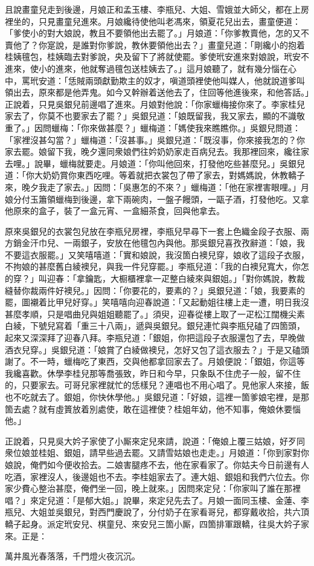 且說畫童兒走到後邊，月娘正和孟玉樓、李瓶兒、大姐、雪娥並大師父，都在上房裡坐的，只見畫童兒進來。月娘纔待使他叫老馮來，領夏花兒出去，畫童便道：「爹使小的對大娘說，教且不要領他出去罷了。」月娘道：「你爹教賣他，怎的又不賣他了？你寔說，是誰對你爹說，教休要領他出去？」畫童兒道：「剛纔小的抱着桂姨氊包，桂姨臨去對爹說，央及留下了將就使罷。爹使玳安進來對娘說，玳安不進來，使小的進來，他就奪過氊包送桂姨去了。」這月娘聽了，就有幾分惱在心中，罵玳安道：「恁賊兩頭獻勤欺主的奴才，嗔道頭裡使他叫媒人，他就說道爹叫領出去，原來都是他弄鬼。如今又幹辦着送他去了，住回等他進後來，和他答話。」正說着，只見吳銀兒前邊唱了進來。月娘對他說：「你家蠟梅接你來了。李家桂兒家去了，你莫不也要家去了罷？」吳銀兒道：「娘既留我，我又家去，顯的不識敬重了。」因問蠟梅：「你來做甚麼？」蠟梅道：「媽使我來瞧瞧你。」吳銀兒問道：「家裡沒甚勾當？」蠟梅道：「沒甚事。」吳銀兒道：「既沒事，你來接我怎的？你家去罷。娘留下我，晚夕還同衆娘們往妗奶奶家走百病兒去。我那裡回來，纔往家去哩。」說畢，蠟梅就要走。月娘道：「你叫他回來，打發他吃些甚麼兒。」吳銀兒道：「你大奶奶賞你東西吃哩。等着就把衣裳包了帶了家去，對媽媽說，休教轎子來，晚夕我走了家去。」因問：「吳惠怎的不來？」蠟梅道：「他在家裡害眼哩。」月娘分付玉簫領蠟梅到後邊，拿下兩碗肉，一盤子饅頭，一甌子酒，打發他吃。又拿他原來的盒子，裝了一盒元宵、一盒細茶食，回與他拿去。

原來吳銀兒的衣裳包兒放在李瓶兒房裡，李瓶兒早尋下一套上色織金段子衣服、兩方銷金汗巾兒、一兩銀子，安放在他氊包內與他。那吳銀兒喜孜孜辭道：「娘，我不要這衣服罷。」又笑嘻嘻道：「實和娘說，我沒箇白襖兒穿，娘收了這段子衣服，不拘娘的甚麼舊白綾襖兒，與我一件兒穿罷。」李瓶兒道：「我的白襖兒寬大，你怎的穿？」叫迎春：「拿鑰匙，大橱櫃裡拿一疋整白綾來與銀姐。」「對你媽說，教裁縫替你裁兩件好襖兒。」因問：「你要花的，要素的？」吳銀兒道：「娘，我要素的罷，圖襯着比甲兒好穿。」笑嘻嘻向迎春說道：「又起動姐往樓上走一遭，明日我沒甚麼孝順，只是唱曲兒與姐姐聽罷了。」須臾，迎春從樓上取了一疋松江闊機尖素白綾，下號兒寫着「重三十八兩」，遞與吳銀兒。銀兒連忙與李瓶兒磕了四箇頭，起來又深深拜了迎春八拜。李瓶兒道：「銀姐，你把這段子衣服還包了去，早晚做酒衣兒穿。」吳銀兒道：「娘賞了白綾做襖兒，怎好又包了這衣服去？」于是又磕頭謝了。不一時，蠟梅吃了東西，交與他都拿回家去了。月娘便說：「銀姐，你這等我纔喜歡。休學李桂兒那等喬張致，昨日和今早，只象臥不住虎子一般，留不住的，只要家去。可哥兒家裡就忙的恁樣兒？連唱也不用心唱了。見他家人來接，飯也不吃就去了。銀姐，你快休學他。」吳銀兒道：「好娘，這裡一箇爹娘宅裡，是那箇去處？就有虛篢放着別處使，敢在這裡使？桂姐年幼，他不知事，俺娘休要惱他。」{}

正說着，只見吳大妗子家使了小厮來定兒來請，說道：「俺娘上覆三姑娘，好歹同衆位娘並桂姐、銀姐，請早些過去罷。又請雪姑娘也走走。」月娘道：「你到家對你娘說，俺們如今便收拾去。二娘害腿疼不去，他在家看家了。你姑夫今日前邊有人吃酒，家裡沒人，後邊姐也不去。李桂姐家去了。連大姐、銀姐和我們六位去。你家少費心整治甚麼，俺們坐一回，晚上就來。」因問來定兒：「你家叫了誰在那裡唱？」來定兒道：「是郁大姐。」說畢，來定兒先去了。月娘一面同玉樓、金蓮、李瓶兒、大姐並吳銀兒，對西門慶說了，分付奶子在家看哥兒，都穿戴收拾，共六頂轎子起身。派定玳安兒、棋童兒、來安兒三箇小厮，四箇排軍跟轎，往吳大妗子家來。正是：

\begin{myquote}
萬井風光春落落，千門燈火夜沉沉。
\end{myquote}

